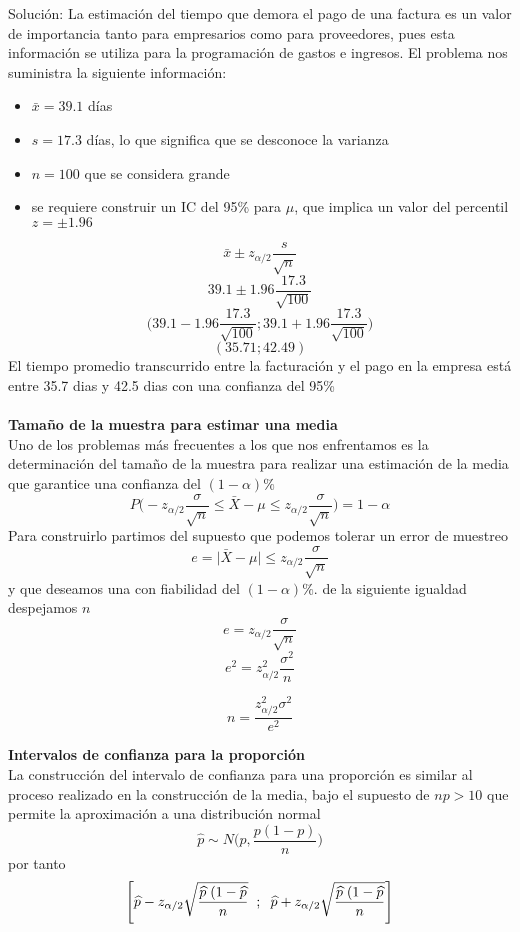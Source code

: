 \documentclass[base=hide,12pt]{elegantbook}
\begin{document}
Solución: La estimación del tiempo que demora el pago de una factura es un valor de importancia tanto para empresarios como para proveedores, pues esta información se utiliza para la programación de gastos e ingresos. El problema nos suministra la siguiente información:
	\begin{itemize} 
	\item $\bar{x}=39.1$ días
	\item $s=17.3$ días, lo que significa que se desconoce la varianza
	\item $n=100$ que se considera grande
	\item se requiere construir un IC del 95\% para $\mu$, que implica un valor del percentil $z=\pm 1.96$
	\end{itemize}
	$$\bar{x} \pm z_{\alpha/2} \frac{s}{\sqrt{n}} $$
	$$39.1 \pm 1.96 \frac{17.3}{\sqrt{100}} $$
	$$\Bigg(39.1 -1.96 \frac{17.3}{\sqrt{100}};39.1 + 1.96 \frac{17.3}{\sqrt{100}}\Bigg)$$
	$$(35.71; 42.49 )$$
	El tiempo promedio transcurrido entre la facturación y el pago en la empresa está entre 35.7 dias y 42.5 dias con una confianza del 95\% \\ \\
\textcolor{col4}{\bf \large Tamaño de la muestra para estimar una media}\\
	Uno de los problemas más frecuentes a los que nos enfrentamos es la determinación del tamaño de la muestra para realizar una estimación de la media que garantice una confianza del $(1-\alpha)\%$
	$$P\Bigg(-z_{\alpha/2}\frac{\sigma}{\sqrt{n}} \leq \bar{X}-\mu \leq z_{\alpha/2}\frac{\sigma}{\sqrt{n}}\Bigg)=1-\alpha$$
	Para construirlo partimos del supuesto que podemos tolerar un error de muestreo
	$$e = \vert\bar{X}-\mu\vert \leq z_{\alpha/2}\frac{\sigma}{\sqrt{n}}$$
	y que deseamos una con fiabilidad del $(1-\alpha)\%$.
	de la siguiente igualdad despejamos $n$\\
	$$e= z_{\alpha/2} \frac{\sigma}{\sqrt{n}}$$
	$$e^{2}= z_{\alpha/2}^{2} \frac{\sigma^{2}}{n}$$


			$$n = \displaystyle\frac{z_{\alpha/2}^{2}\sigma^{2}}{e^{2}}$$
			
	
\textcolor{col4}{\bf \large Intervalos de confianza para la proporción}\\
	La construcción del intervalo de confianza para una proporción es similar al proceso realizado en la construcción de la media, bajo el supuesto de $np>10$ que permite la aproximación a una distribución normal
	$$\widehat{p} \sim N\Big(p, \frac{p(1-p)}{n}\Big) $$
	por tanto
	$$\Bigg[\widehat{p}-z_{\alpha/2}\sqrt{\frac{\widehat{p}\hspace{.1cm}(1-\widehat{p}}{n}} \hspace{.2cm};\hspace{.2cm} \widehat{p}+z_{\alpha/2}\sqrt{\frac{\widehat{p}\hspace{.1cm}(1-\widehat{p}}{n}} \Bigg] $$
	
\end{document}

